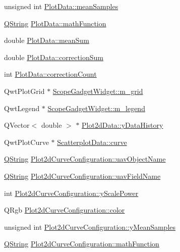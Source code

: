 \begin{DoxyCompactItemize}
unsigned int \hyperlink{group___scope_plugin_ga577111acdda17558321da13bff25a7c0}{\-Plot\-Data\-::mean\-Samples}
\item 
\hyperlink{group___u_a_v_objects_plugin_gab9d252f49c333c94a72f97ce3105a32d}{\-Q\-String} \hyperlink{group___scope_plugin_gaa8ea6880a7faa36947144d2df62d6642}{\-Plot\-Data\-::math\-Function}
\item 
double \hyperlink{group___scope_plugin_ga619dc668a50f1123f71de7baa4dc5f9c}{\-Plot\-Data\-::mean\-Sum}
\item 
double \hyperlink{group___scope_plugin_ga802021e218f3dadce03011cdeea7d90b}{\-Plot\-Data\-::correction\-Sum}
\item 
int \hyperlink{group___scope_plugin_ga85cd1767be2be06460ecbbd11b9ec366}{\-Plot\-Data\-::correction\-Count}
\item 
\-Qwt\-Plot\-Grid $\ast$ \hyperlink{group___scope_plugin_gaccb00d0e9720797980ac9f03c545e756}{\-Scope\-Gadget\-Widget\-::m\-\_\-grid}
\item 
\-Qwt\-Legend $\ast$ \hyperlink{group___scope_plugin_ga2ee6ef41538d48a8d6f653765bcb80a6}{\-Scope\-Gadget\-Widget\-::m\-\_\-legend}
\item 
\-Q\-Vector$<$ double $>$ $\ast$ \hyperlink{group___scope_plugin_ga3f05450290135f9d3b69ab0119718f11}{\-Plot2d\-Data\-::y\-Data\-History}
\item 
\-Qwt\-Plot\-Curve $\ast$ \hyperlink{group___scope_plugin_ga4a0647f875271067323cf2ad3868afa4}{\-Scatterplot\-Data\-::curve}
\item 
\hyperlink{group___u_a_v_objects_plugin_gab9d252f49c333c94a72f97ce3105a32d}{\-Q\-String} \hyperlink{group___scope_plugin_gaf7c7f2da1da17096fbffa1fdaa35d30e}{\-Plot2d\-Curve\-Configuration\-::uav\-Object\-Name}
\item 
\hyperlink{group___u_a_v_objects_plugin_gab9d252f49c333c94a72f97ce3105a32d}{\-Q\-String} \hyperlink{group___scope_plugin_ga5f9e57253d839d8b0094e4360f61155f}{\-Plot2d\-Curve\-Configuration\-::uav\-Field\-Name}
\item 
int \hyperlink{group___scope_plugin_ga42557670a9e1e7f792d3ecb795387425}{\-Plot2d\-Curve\-Configuration\-::y\-Scale\-Power}
\item 
\-Q\-Rgb \hyperlink{group___scope_plugin_ga287675d34d68fc61f7de6bc82fed788d}{\-Plot2d\-Curve\-Configuration\-::color}
\item 
unsigned int \hyperlink{group___scope_plugin_gabe6fab440d33b0a9cb4ad4db2950c26d}{\-Plot2d\-Curve\-Configuration\-::y\-Mean\-Samples}
\item 
\hyperlink{group___u_a_v_objects_plugin_gab9d252f49c333c94a72f97ce3105a32d}{\-Q\-String} \hyperlink{group___scope_plugin_gac0be9d46aeaed52d3ee1e796946969ed}{\-Plot2d\-Curve\-Configuration\-::math\-Function}

\end{DoxyCompactItemize}
